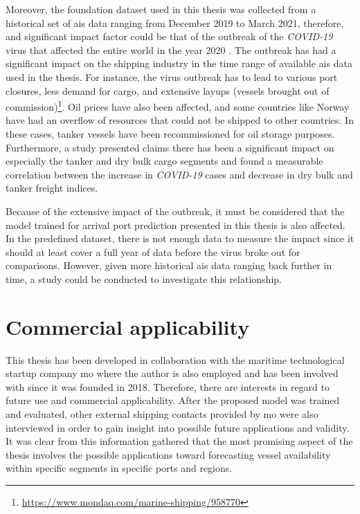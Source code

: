 Moreover, the foundation dataset used in this thesis was collected from a historical set of \acrshort{ais} data ranging from December 2019 to March 2021, therefore, and significant impact factor could be that of the outbreak of the \textit{COVID-19} virus that affected the entire world in the year 2020 \parencite{covid_article}. The outbreak has had a significant impact on the shipping industry in the time range of available \acrshort{ais} data used in the thesis. For instance, the virus outbreak has to lead to various port closures, less demand for cargo, and extensive layups (vessels brought out of commission)\footnote{\url{https://www.mondaq.com/marine-shipping/958770}}. Oil prices have also been affected, and some countries like Norway have had an overflow of resources that could not be shipped to other countries. In these cases, tanker vessels have been recommissioned for oil storage purposes. Furthermore, a study presented \cite{MICHAIL2020100178} claims there has been a significant impact on especially the tanker and dry bulk cargo segments and found a measurable correlation between the increase in \textit{COVID-19} cases and decrease in dry bulk and tanker freight indices.

Because of the extensive impact of the outbreak, it must be considered that the model trained for arrival port prediction presented in this thesis is also affected. In the predefined dataset, there is not enough data to measure the impact since it should at least cover a full year of data before the virus broke out for comparisons. However, given more historical \acrshort{ais} data ranging back further in time, a study could be conducted to investigate this relationship.

\section{Commercial applicability}

This thesis has been developed in collaboration with the maritime technological startup company \acrfull{mo} where the author is also employed and has been involved with since it was founded in 2018. Therefore, there are interests in regard to future use and commercial applicability. After the proposed model was trained and evaluated, other external shipping contacts provided by \acrshort{mo} were also interviewed in order to gain insight into possible future applications and validity. It was clear from this information gathered that the most promising aspect of the thesis involves the possible applications toward forecasting vessel availability within specific segments in specific ports and regions.

